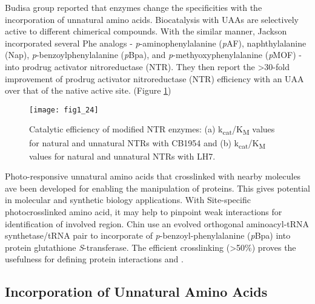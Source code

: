 \begin{refsection}
Budisa group reported that enzymes change the specificities with the
incorporation of unnatural amino acids\cite{Budisa2006}. Biocatalysis with UAAs
are selectively active to different chimerical compounds. With the similar
manner, Jackson  incorporated several Phe analogs -
\emph{p}-aminophenylalanine (\emph{p}AF), naphthylalanine (Nap),
\emph{p}-benzoylphenylalanine (\emph{p}Bpa), and \emph{p}-methyoxyphenylalanine
(\emph{p}MOF) - into prodrug activator nitroreductase (NTR). They then report
the >30-fold improvement of prodrug activator nitroreductase (NTR) efficiency
with an UAA over that of the native active site\cite{Jackson2006a}. (Figure
\ref{fig:selectivity-example})
\begin{figure}[h!] \centering \texttt{[image: fig1\_24]}
    \caption[Catalytic efficiency of modified NTR enzymes: (a)
        k\textsubscript{cat}/K\textsubscript{M} values for natural and
        unnatural NTRs with CB1954 and (b)
        k\textsubscript{cat}/K\textsubscript{M} values for natural and
    unnatural NTRs with LH7.]{Catalytic efficiency of modified NTR enzymes: (a)
        k\textsubscript{cat}/K\textsubscript{M} values for natural and
        unnatural NTRs with CB1954 and (b)
        k\textsubscript{cat}/K\textsubscript{M} values for natural and
        unnatural NTRs with LH7\cite{Jackson2006a}.}
    \label{fig:selectivity-example} 
\end{figure}

Photo-responsive unnatural amino acids that crosslinked with nearby
molecules ave been developed for enabling the  manipulation of
proteins. This gives potential in molecular and synthetic biology applications.
With Site-specific photocrosslinked amino acid, it may help to pinpoint weak
interactions for identification of involved region. Chin  use an
evolved orthogonal aminoacyl-tRNA synthetase/tRNA pair to incorporate of
\emph{p}-benzoyl-phenylalanine (\emph{p}Bpa) into protein glutathione
\emph{S}-transferase\cite{Chin2002}. The efficient crosslinking (>50\%) proves
the usefulness for defining protein interactions  and .

\subsection{Incorporation of Unnatural Amino Acids} 
\label{sec:rsi-intro}


\end{refsection}
